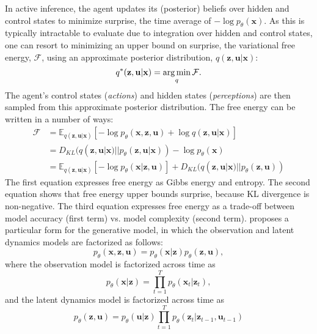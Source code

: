 In active inference, the agent updates its (posterior) beliefs over hidden and control states to minimize surprise, the time average of $-\log p_\theta (\mathbf{x})$. As this is typically intractable to evaluate due to integration over hidden and control states, one can resort to minimizing an upper bound on surprise, the variational free energy, $\mathcal{F}$, using an approximate posterior distribution, $q (\mathbf{z}, \mathbf{u} | \mathbf{x})$:
\begin{equation}
    q^*(\mathbf{z}, \mathbf{u} | \mathbf{x}) = \operatorname*{arg\,min}_q \mathcal{F}.
\end{equation}
The agent's control states (\textit{actions}) and hidden states (\textit{perceptions}) are then sampled from this approximate posterior distribution. The free energy can be written in a number of ways:
\begin{align}
    \mathcal{F} & = \mathbb{E}_{q (\mathbf{z}, \mathbf{u} | \mathbf{x})} \left[ -\log p_\theta (\mathbf{x}, \mathbf{z}, \mathbf{u}) + \log q (\mathbf{z}, \mathbf{u} | \mathbf{x}) \right] \\
    & =  D_{KL}(q (\mathbf{z}, \mathbf{u} | \mathbf{x}) || p_\theta (\mathbf{z}, \mathbf{u} | \mathbf{x})) - \log p_\theta (\mathbf{x}) \\
    & = \mathbb{E}_{q (\mathbf{z}, \mathbf{u} | \mathbf{x})} \left[ -\log p_\theta (\mathbf{x} | \mathbf{z}, \mathbf{u}) \right] + D_{KL}(q (\mathbf{z}, \mathbf{u} | \mathbf{x}) || p_\theta (\mathbf{z}, \mathbf{u}))
\end{align}
The first equation expresses free energy as Gibbs energy and entropy. The second equation shows that free energy upper bounds surprise, because KL divergence is non-negative. The third equation expresses free energy as a trade-off between model accuracy (first term) vs. model complexity (second term). \cite{friston2013anatomy} proposes a particular form for the generative model, in which the observation and latent dynamics models are factorized as follows:
\begin{equation}
    p_\theta (\mathbf{x}, \mathbf{z}, \mathbf{u}) = p_\theta (\mathbf{x} | \mathbf{z}) p_\theta (\mathbf{z}, \mathbf{u}),
\end{equation}
where the observation model is factorized across time as
\begin{equation}
    p_\theta (\mathbf{x} | \mathbf{z}) = \prod_{t=1}^T p_\theta (\mathbf{x}_t | \mathbf{z}_t),
\end{equation}
and the latent dynamics model is factorized across time as
\begin{equation}
    p_\theta (\mathbf{z}, \mathbf{u}) = p_\theta (\mathbf{u} | \mathbf{z}) \prod_{t=1}^T p_\theta (\mathbf{z}_t | \mathbf{z}_{t-1}, \mathbf{u}_{t-1})
\end{equation}
